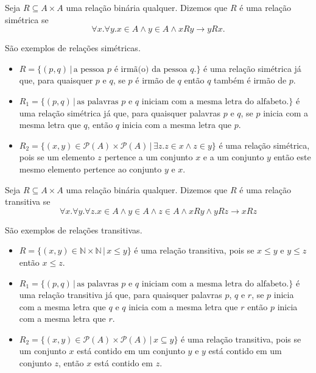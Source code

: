 \begin{Definition}
Seja $R\subseteq A \times A$ uma relação binária qualquer. Dizemos que
$R$ é uma relação simétrica se
\[\forall x.\forall y. x \in A \land y\in A \land x R y \to y R x. \]
\end{Definition}
\begin{Example}
São exemplos de relações simétricas.
\begin{itemize}
   \item $R = \{(p,q)\,|\,\text{a pessoa $p$ é irmã(o) da pessoa
     }q.\}$ é uma relação simétrica já que, para quaisquer $p$ e $q$,
    se $p$ é irmão de $q$ então $q$ também é irmão de $p$.
  \item $R_1 = \{(p,q)\,|\,\text{as palavras $p$ e $q$ iniciam com a
      mesma letra do alfabeto.}\}$ é uma relação simétrica já que,
    para quaisquer palavras $p$ e $q$, se $p$ inicia com a mesma letra
    que $q$, então $q$ inicia com a mesma letra que $p$.
  \item $R_2=\{(x,y)\in\mathcal{P}(A)\times\mathcal{P}(A)\,|\,\exists
    z. z \in x \land z \in y\}$ é uma relação simétrica, pois se um
    elemento $z$ pertence a um conjunto $x$ e a um conjunto $y$ então
    este mesmo elemento pertence ao conjunto $y$ e $x$.
\end{itemize}
\end{Example}

\begin{Definition}
Seja $R\subseteq A \times A$ uma relação binária qualquer. Dizemos que
$R$ é uma relação transitiva se
\[
\forall x.\forall y. \forall z. x \in A \land y \in A \land z \in A
\land xRy \land yRz \to xRz
\]
\end{Definition}


\begin{Example}
São exemplos de relações transitivas.
\begin{itemize}
  \item $R = \{(x,y) \in \mathbb{N} \times \mathbb{N}\,|\, x \leq
    y\}$ é uma relação transitiva, pois se $x \leq y$ e $y \leq z$
    então $x\leq z$.
  \item $R_1 = \{(p,q)\,|\,\text{as palavras $p$ e $q$ iniciam com a
      mesma letra do alfabeto.}\}$ é uma relação transitiva já que,
    para quaisquer palavras $p$, $q$ e $r$, se $p$ inicia com a mesma letra
    que $q$ e $q$ inicia com a mesma letra que $r$ então $p$ inicia
    com a mesma letra que $r$.
  \item
    $R_2=\{(x,y)\in\mathcal{P}(A)\times\mathcal{P}(A)\,|\,x\subseteq y\}$ é uma relação transitiva, pois se um
    conjunto $x$ está contido em um conjunto $y$ e $y$ está contido em
    um conjunto $z$, então $x$ está contido em $z$.
\end{itemize}
\end{Example}


